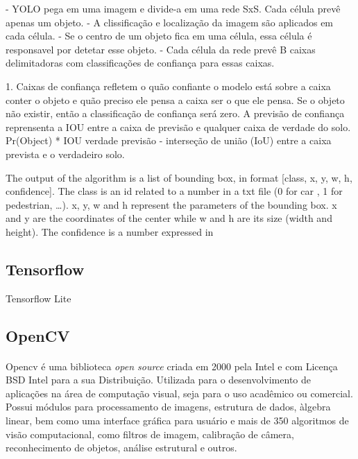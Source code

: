 - YOLO pega em uma imagem e divide-a em uma rede SxS. Cada célula prevê apenas um objeto.
- A clissificação e localização da imagem são aplicados em cada célula.
- Se o centro de um objeto fica em uma célula, essa célula é responsavel por detetar esse objeto.
- Cada célula da rede prevê B caixas delimitadoras com classificações de confiança para essas caixas.

1. Caixas de confiança refletem o quão confiante o modelo está sobre a caixa conter o objeto e quão preciso ele pensa a caixa ser o que ele pensa. Se o objeto não existir, então a classificação de confiança será zero. 
\newline
A previsão de confiança reprensenta a IOU entre a caixa de previsão e qualquer caixa de verdade do solo.
Pr(Object) * IOU verdade previsão - interseção de união (\ac{IoU}) entre a caixa prevista e o verdadeiro solo.







The output of the algorithm is a list of bounding box, in format [class, x, y, w, h, confidence]. The class is an id related to a number in a txt file (0 for car , 1 for pedestrian, …). x, y, w and h represent the parameters of the bounding box. x and y are the coordinates of the center while w and h are its size (width and height). The confidence is a number expressed in %

\subsection{Tensorflow}
\label{chap2:subsec:tensorflow}

Tensorflow Lite


\subsection{OpenCV}
\label{chap2:subsec:opencv}
\paragraph{}

Opencv é uma biblioteca \textit{open source} criada em 2000 pela Intel e com Licença BSD Intel para a sua Distribuição. Utilizada para o desenvolvimento de aplicações na área de computação visual, seja para o uso acadêmico ou comercial. Possui módulos para processamento de imagens, estrutura de dados, àlgebra linear, bem como uma interface gráfica para usuário e mais de 350 algoritmos de visão computacional, como filtros de imagem, calibração de câmera, reconhecimento de objetos, análise estrutural e outros.


